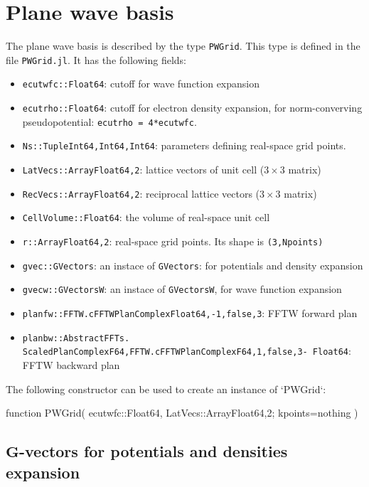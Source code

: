\documentclass[a4paper,10pt]{paper}
\newcommand{\jlcode}[1]{\texttt{#1}}
\begin{document}
\section{Plane wave basis}

The plane wave basis is described by the type \jlcode{PWGrid}.
This type is defined in the file \jlcode{PWGrid.jl}. It has the following fields:
\begin{itemize}
%
\item \jlcode{ecutwfc::Float64}: cutoff for wave function expansion
%
\item \jlcode{ecutrho::Float64}: cutoff for electron density expansion, for norm-converving
  pseudopotential: \jlcode{ecutrho = 4*ecutwfc}.
%
\item \jlcode{Ns::Tuple{Int64,Int64,Int64}}: parameters defining real-space grid points.
%
\item \jlcode{LatVecs::Array{Float64,2}}: lattice vectors of unit cell ($3\times3$ matrix)
%
\item \jlcode{RecVecs::Array{Float64,2}}: reciprocal lattice vectors ($3\times3$ matrix)
%
\item \jlcode{CellVolume::Float64}: the volume of real-space unit cell
%
\item \jlcode{r::Array{Float64,2}}: real-space grid points.
  Its shape is \jlcode{(3,Npoints)}
%
\item \jlcode{gvec::GVectors}: an instace of \jlcode{GVectors}:
  for potentials and density expansion
%
\item \jlcode{gvecw::GVectorsW}: an instace of \jlcode{GVectorsW}, for wave function expansion
%
\item \jlcode{planfw::FFTW.cFFTWPlan{Complex{Float64},-1,false,3}}: FFTW forward plan
%
\item \jlcode{planbw::AbstractFFTs.}\\
      \jlcode{ScaledPlan{ComplexF64,FFTW.cFFTWPlan{ComplexF64,1,false,3- Float64}}}: FFTW backward plan
%
\end{itemize}

The following constructor can be used to create an instance of `PWGrid`:

\begin{juliacode}
function PWGrid( ecutwfc::Float64,
                 LatVecs::Array{Float64,2};
                 kpoints=nothing )
\end{juliacode}


\subsection{$\mathbf{G}$-vectors for potentials and densities expansion}
\end{document}
